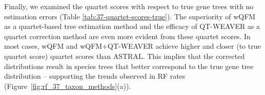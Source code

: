 \documentclass[10pt,a4paper]{article}
\begin{document}
Finally, we examined the quartet scores with respect to true gene trees with no estimation errors (Table \ref{tab:37-quartet-scores-true}). The superiority of wQFM as a quartet-based tree estimation method and the efficacy of QT-WEAVER as a quartet correction method are even more evident from these quartet scores. %
In most cases, wQFM and wQFM+QT-WEAVER achieve higher and closer (to true quartet score) quartet scores than ASTRAL. This implies that the corrected distributions result in species trees that better correspond to the true gene tree distribution -- supporting the trends observed in RF rates (Figure~\ref{fig:rf_37_taxon_methods}(a)). 







\end{document}

